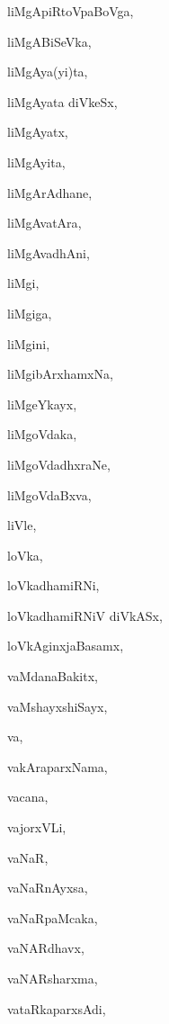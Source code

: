 \begin{multicols}{2}
{liMgApiRtoVpaBoVga}, \pageref{liMgApiRtoVpaBoVga}

{liMgABiSeVka}, \pageref{liMgABiSeVka}

{liMgAya(yi)ta}, \pageref{liMgAyayita}

{liMgAyata diVkeSx}, \pageref{liMgAyatadiVkeSx}

{liMgAyatx}, \pageref{liMgAyatx}

{liMgAyita}, \pageref{liMgAyita}

{liMgArAdhane}, \pageref{liMgArAdhane}

{liMgAvatAra}, \pageref{liMgAvatAra}

{liMgAvadhAni}, \pageref{liMgAvadhAni}

{liMgi}, \pageref{liMgi}

{liMgiga}, \pageref{liMgiga}

{liMgini}, \pageref{liMgini}

{liMgibArxhamxNa}, \pageref{liMgibArxhamxNa}

{liMgeYkayx}, \pageref{liMgeYkayx}

{liMgoVdaka}, \pageref{liMgoVdaka}

{liMgoVdadhxraNe}, \pageref{liMgoVdadhxraNe}

{liMgoVdaBxva}, \pageref{liMgoVdaBxva}

{liVle}, \pageref{liVle}

{loVka}, \pageref{loVka}

{loVkadhamiRNi}, \pageref{loVkadhamiRNi}

{loVkadhamiRNiV diVkASx}, \pageref{loVkadhamiRNiVdiVkASx}

{loVkAginxjaBasamx}, \pageref{loVkAginxjaBasamx}

{vaMdanaBakitx}, \pageref{vaMdanaBakitx}

{vaMshayxshiSayx}, \pageref{vaMshayxshiSayx}

{va}, \pageref{va}

{vakAraparxNama}, \pageref{vakAraparxNama}

{vacana}, \pageref{vacana}

{vajorxVLi}, \pageref{vajorxVLi}

{vaNaR}, \pageref{vaNaR}

{vaNaRnAyxsa}, \pageref{vaNaRnAyxsa}

{vaNaRpaMcaka}, \pageref{vaNaRpaMcaka}

{vaNARdhavx}, \pageref{vaNARdhavx}

{vaNARsharxma}, \pageref{vaNARsharxma}

{vataRkaparxsAdi}, \pageref{vataRkaparxsAdi}


\end{multicols}
